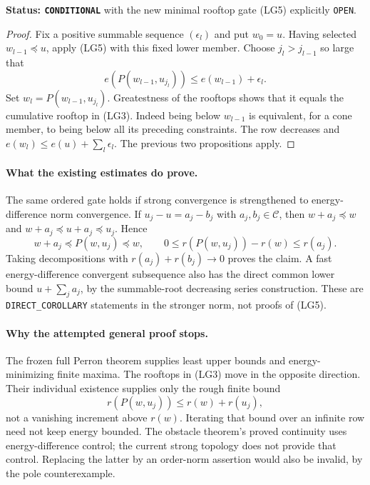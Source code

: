 \documentclass[11pt,a4paper]{article}
\numberwithin{equation}{section}
\theoremstyle{definition}
\theoremstyle{remark}
\begin{document}
\noindent\textbf{Status: \texttt{CONDITIONAL}} with
the new minimal rooftop gate \textup{(LG5)} explicitly
\texttt{OPEN}.

\begin{proof}
Fix a positive summable sequence $(\epsilon_l)$ and
put $w_0=u$.  Having selected $w_{l-1}\preceq u$,
apply \textup{(LG5)} with this fixed lower member.
Choose $j_l>j_{l-1}$ so large that
\[
          e(P(w_{l-1},u_{j_l}))
                                 \le e(w_{l-1})+\epsilon_l.
\]
Set $w_l=P(w_{l-1},u_{j_l})$.  Greatestness of
the rooftops shows that it equals the cumulative
rooftop in \textup{(LG3)}.  Indeed being below
$w_{l-1}$ is equivalent, for a cone member, to
being below all its preceding constraints.
The row decreases and
$e(w_l)\le e(u)+\sum_l\epsilon_l$.
The previous two propositions apply.
\end{proof}

\paragraph{What the existing estimates do prove.}
The same ordered gate holds if strong convergence
is strengthened to energy-difference norm convergence.
If $u_j-u=a_j-b_j$ with $a_j,b_j\in\mathscr C$,
then $w+a_j\preceq w$ and
$w+a_j\preceq u+a_j\preceq u_j$.  Hence
\[
  w+a_j\preceq P(w,u_j)\preceq w,
 \qquad
 0\le r(P(w,u_j))-r(w)\le r(a_j).
 \tag{LG6}
\]
Taking decompositions with
$r(a_j)+r(b_j)\to0$ proves the claim.  A fast
energy-difference convergent subsequence also has
the direct common lower bound
$u+\sum_j a_j$, by the summable-root decreasing
series construction.  These are
\texttt{DIRECT\_COROLLARY} statements in the
stronger norm, not proofs of \textup{(LG5)}.

\paragraph{Why the attempted general proof stops.}
The frozen full Perron theorem supplies least upper
bounds and energy-minimizing finite maxima.  The
rooftops in \textup{(LG3)} move in the opposite
direction.  Their individual existence supplies
only the rough finite bound
\[
                   r(P(w,u_j))\le r(w)+r(u_j),
 \tag{LG7}
\]
not a vanishing increment above $r(w)$.  Iterating
that bound over an infinite row need not keep energy
bounded.  The obstacle theorem's proved continuity
uses energy-difference control; the current strong
topology does not provide that control.  Replacing
the latter by an order-norm assertion would also
be invalid, by the pole counterexample.
\end{document}
